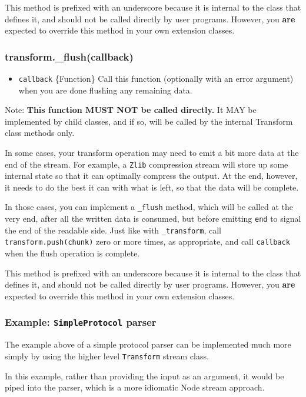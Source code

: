 This method is prefixed with an underscore because it is internal to the
class that defines it, and should not be called directly by user
programs. However, you \textbf{are} expected to override this method in
your own extension classes.

\subsubsection{transform.\_flush(callback)}

\begin{itemize}
\item
  \texttt{callback} \{Function\} Call this function (optionally with an
  error argument) when you are done flushing any remaining data.
\end{itemize}

Note: \textbf{This function MUST NOT be called directly.} It MAY be
implemented by child classes, and if so, will be called by the internal
Transform class methods only.

In some cases, your transform operation may need to emit a bit more data
at the end of the stream. For example, a \texttt{Zlib} compression
stream will store up some internal state so that it can optimally
compress the output. At the end, however, it needs to do the best it can
with what is left, so that the data will be complete.

In those cases, you can implement a \texttt{\_flush} method, which will
be called at the very end, after all the written data is consumed, but
before emitting \texttt{end} to signal the end of the readable side.
Just like with \texttt{\_transform}, call \texttt{transform.push(chunk)}
zero or more times, as appropriate, and call \texttt{callback} when the
flush operation is complete.

This method is prefixed with an underscore because it is internal to the
class that defines it, and should not be called directly by user
programs. However, you \textbf{are} expected to override this method in
your own extension classes.

\subsubsection{Example: \texttt{SimpleProtocol} parser}

The example above of a simple protocol parser can be implemented much
more simply by using the higher level \texttt{Transform} stream class.

In this example, rather than providing the input as an argument, it
would be piped into the parser, which is a more idiomatic Node stream
approach.

